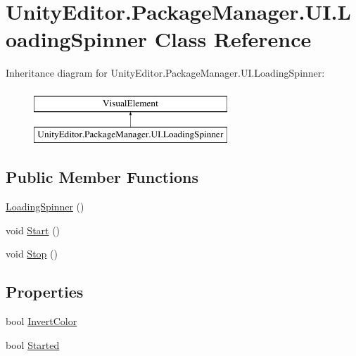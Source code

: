 \hypertarget{class_unity_editor_1_1_package_manager_1_1_u_i_1_1_loading_spinner}{}\section{Unity\+Editor.\+Package\+Manager.\+U\+I.\+Loading\+Spinner Class Reference}
\label{class_unity_editor_1_1_package_manager_1_1_u_i_1_1_loading_spinner}
Inheritance diagram for Unity\+Editor.\+Package\+Manager.\+U\+I.\+Loading\+Spinner\+:\begin{figure}[H]
\begin{center}
\leavevmode
\includegraphics[height=2.000000cm]{class_unity_editor_1_1_package_manager_1_1_u_i_1_1_loading_spinner}
\end{center}
\end{figure}
\subsection*{Public Member Functions}
\begin{DoxyCompactItemize}
\item 
\mbox{\hyperlink{class_unity_editor_1_1_package_manager_1_1_u_i_1_1_loading_spinner_a5f826f8913ed7250adff79417233f870}{Loading\+Spinner}} ()
\item 
void \mbox{\hyperlink{class_unity_editor_1_1_package_manager_1_1_u_i_1_1_loading_spinner_ad559c1d41767f5f48ae5556a7003a3dc}{Start}} ()
\item 
void \mbox{\hyperlink{class_unity_editor_1_1_package_manager_1_1_u_i_1_1_loading_spinner_a70c60e8f4237f93733e0a78fff702b96}{Stop}} ()
\end{DoxyCompactItemize}
\subsection*{Properties}
\begin{DoxyCompactItemize}
\item 
bool \mbox{\hyperlink{class_unity_editor_1_1_package_manager_1_1_u_i_1_1_loading_spinner_a1c2d49803fb29a6c558024e32e36203c}{Invert\+Color}}
\item 
bool \mbox{\hyperlink{class_unity_editor_1_1_package_manager_1_1_u_i_1_1_loading_spinner_a306f9c9a80e18518a2417ad79452c7de}{Started}}
\end{DoxyCompactItemize}


